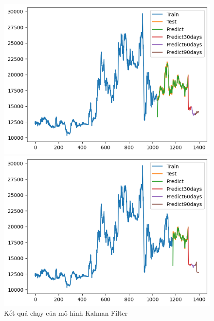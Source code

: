 \begin{figure}[H]
\begin{minipage}{0.15\textwidth}
    \end{minipage}
    \hfill
    \begin{minipage}{0.15\textwidth}
    \centering
    \includegraphics[width=1\textwidth]{resources/chapter-5/newdata1/result/KF_EXIM_8_2.png}
    \end{minipage}
    \hfill
        \begin{minipage}{0.15\textwidth}
    \centering
    \includegraphics[width=1\textwidth]{resources/chapter-5/newdata1/result/KF_EXIM_9_1.png}
    \end{minipage}
    \hfill
    
    \caption{Kết quả chạy của mô hình Kalman Filter}
    \label{fig:KalmanFilter}
\end{figure}

